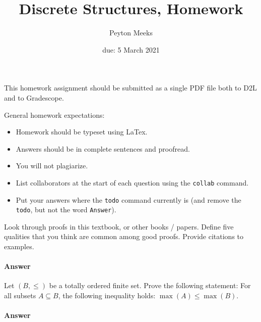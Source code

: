 \documentclass{article}
\title{Discrete Structures, Homework \hwnum}
\author{Peyton Meeks}
\date{due: 5 March 2021}
\begin{document}
\maketitle

This homework assignment should be
submitted as a single PDF file both to D2L and to Gradescope.

General homework expectations:
\begin{itemize}
    \item Homework should be typeset using LaTex.
    \item Answers should be in complete sentences and proofread.
    \item You will not plagiarize.
    \item List collaborators at the start of each question using the \texttt{collab} command.
    \item Put your answers where the \texttt{todo} command currently is (and
        remove the \texttt{todo}, but not the word \texttt{Answer}).
\end{itemize}


\collab{\todo{}} 

Look through proofs in this textbook, or other books / papers.  Define five
qualities that you think are common among good proofs. Provide citations to
examples.


\paragraph{Answer}




 

Let $(B,\leq)$ be a totally ordered finite set. Prove the following
statement: For all subsets $A \subseteq B$, the following inequality
holds: $\max(A) \leq \max(B)$.

\paragraph{Answer}
\end{document}

